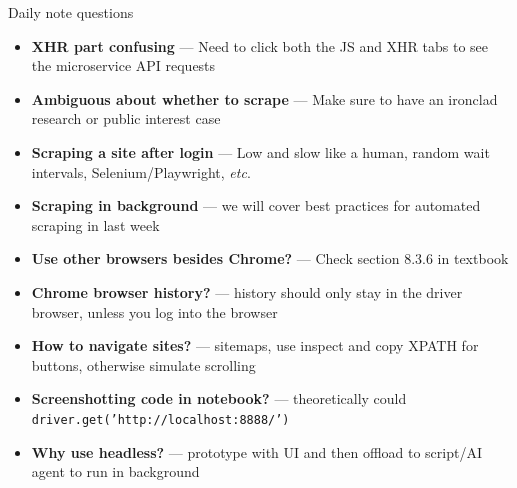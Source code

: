 \documentclass[9pt,aspectratio=169]{beamer}
\begin{document}
\begin{frame}{Daily note questions}\small
    \begin{itemize}
        \item \textbf{XHR part confusing} --- Need to click both the JS and XHR tabs to see the microservice API requests
        \item \textbf{Ambiguous about whether to scrape} --- Make sure to have an ironclad research or public interest case
        \item \textbf{Scraping a site after login} --- Low and slow like a human, random wait intervals, Selenium/Playwright, \textit{etc}.
        \item \textbf{Scraping in background} --- we will cover best practices for automated scraping in last week
        \item \textbf{Use other browsers besides Chrome?} --- Check section 8.3.6 in textbook
        \item \textbf{Chrome browser history?} --- history should only stay in the driver browser, unless you log into the browser
        \item \textbf{How to navigate sites?} --- sitemaps, use inspect and copy XPATH for buttons, otherwise simulate scrolling
        \item \textbf{Screenshotting code in notebook?} --- theoretically could \texttt{driver.get('http://localhost:8888/')} 
        \item \textbf{Why use headless?} --- prototype with UI and then offload to script/AI agent to run in background
    \end{itemize}
\end{frame}
\end{document}
